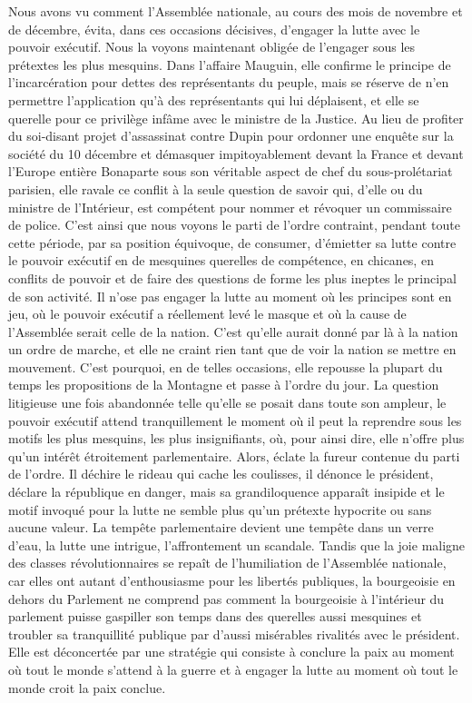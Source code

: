 \documentclass[french,twoside]{book} %
\begin{document}
Nous avons vu comment l’Assemblée nationale, au cours des mois de novembre et de décembre, évita, dans ces occasions décisives, d’engager la lutte avec le pouvoir exécutif. Nous la voyons maintenant obligée de l’engager sous les prétextes les plus mesquins. Dans l’affaire Mauguin, elle confirme le principe de l’incarcération pour dettes des représentants du peuple, mais se réserve de n’en permettre l’application qu’à des représentants qui lui déplaisent, et elle se querelle pour ce privilège infâme avec le ministre de la Justice. Au lieu de profiter du soi-disant projet d’assassinat contre Dupin pour ordonner une enquête sur la société du 10 décembre et démasquer impitoyablement devant la France et devant l’Europe entière Bonaparte sous son véritable aspect de chef du sous-prolétariat parisien, elle ravale ce conflit à la seule question de savoir qui, d’elle ou du ministre de l’Intérieur, est compétent pour nommer et révoquer un commissaire de police. C’est ainsi que nous voyons le parti de l’ordre contraint, pendant toute cette période, par sa position équivoque, de consumer, d’émietter sa lutte contre le pouvoir exécutif en de mesquines querelles de compétence, en chicanes, en conflits de pouvoir et de faire des questions de forme les plus ineptes le principal de son activité. Il n’ose pas engager la lutte au moment où les principes sont en jeu, où le pouvoir exécutif a réellement levé le masque et où la cause de l’Assemblée serait celle de la nation. C’est qu’elle aurait donné par là à la nation un ordre de marche, et elle ne craint rien tant que de voir la nation se mettre en mouvement. C’est pourquoi, en de telles occasions, elle repousse la plupart du temps les propositions de la Montagne et passe à l’ordre du jour. La question litigieuse une fois abandonnée telle qu’elle se posait dans toute son ampleur, le pouvoir exécutif attend tranquillement le moment où il peut la reprendre sous les motifs les plus mesquins, les plus insignifiants, où, pour ainsi dire, elle n’offre plus qu’un intérêt étroitement parlementaire. Alors, éclate la fureur contenue du parti de l’ordre. Il déchire le rideau qui cache les coulisses, il dénonce le président, déclare la république en danger, mais sa grandiloquence apparaît insipide et le motif invoqué pour la lutte ne semble plus qu’un prétexte hypocrite ou sans aucune valeur. La tempête parlementaire devient une tempête dans un verre d’eau, la lutte une intrigue, l’affrontement un scandale. Tandis que la joie maligne des classes révolutionnaires se repaît de l’humiliation de l’Assemblée nationale, car elles ont autant d’enthousiasme pour les libertés publiques, la bourgeoisie en dehors du Parlement ne comprend pas comment la bourgeoisie à l’intérieur du parlement puisse gaspiller son temps dans des querelles aussi mesquines et troubler sa tranquillité publique par d’aussi misérables rivalités avec le président. Elle est déconcertée par une stratégie qui consiste à conclure la paix au moment où tout le monde s’attend à la guerre et à engager la lutte au moment où tout le monde croit la paix conclue.\par
\end{document}
